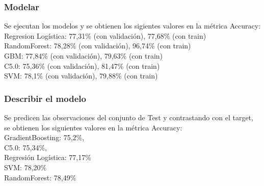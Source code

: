 \subsubsection{Modelar}

Se ejecutan los modelos y se obtienen los sigientes valores en la métrica Accuracy:\\
Regresion Logística: 77,31\% (con validación), 77,68\% (con train)\\
RandomForest: 78,28\% (con validación), 96,74\% (con train)\\
GBM: 77,84\% (con validación), 79,63\% (con train)\\
C5.0: 75,36\% (con validación), 81,47\% (con train)\\
SVM: 78,1\% (con validación), 79,88\% (con train)

\subsubsection{Describir el modelo}

Se predicen las observaciones del conjunto de Test y contrastando con el target, se obtienen los siguientes valores en la métrica Accuracy:\\
GradientBoosting: 75,2\%,\\
C5.0: 75,34\%,\\
Regresión Logística: 77,17\%\\
SVM: 78,20\%\\
RandomForest: 78,49\%


%
%
%
%
